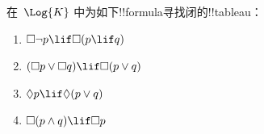 \documentclass[../../../include/open-logic-section]{subfiles}
\begin{document}
\begin{prob}
  在~$\Log{K}$ 中为如下!!{formula}寻找闭的!!{tableau}：
  \begin{enumerate}
    \item $\Box \lnot p \lif \Box(p \lif q)$
    \item $(\Box p \lor \Box q) \lif \Box(p \lor q)$
    \item $\Diamond p \lif \Diamond(p \lor q)$
    \item $\Box(p \land q) \lif \Box p$
  \end{enumerate}
\end{prob}
\end{document}
